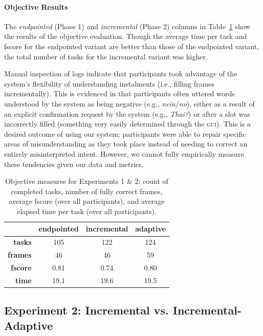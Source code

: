 \documentclass[11pt]{article}
\newcommand{\ui}[0]{\textsc{gui}}
\begin{document}
\paragraph{Objective Results}  The \emph{endpointed} (Phase 1) and \emph{incremental} (Phase 2) columns in Table~\ref{tab:objscores} show the results of the objective evaluation. Though the average time per task and fscore for the endpointed variant are better than those of the endpointed variant, the total number of tasks for the incremental variant was higher. 

Manual inspection of logs indicate that participants took advantage of the system's flexibility of understanding instalments (i.e., filling frames incrementally). This is evidenced in that participants often uttered words understood by the system as being negative (e.g., \emph{nein}/\emph{no}), either as a result of an explicit confirmation request by the system (e.g., \emph{Thai?}) or after a slot was incorrectly filled (something very easily determined through the \ui). This is a desired outcome of using our system; participants were able to repair specific areas of misunderstanding as they took place instead of needing to correct an entirely misinterpreted intent. However, we cannot fully empirically measure these tendencies given our data and metrics. 

\begin{table}
 \begin{tabular}{|r|c|c|c|}
\hline
                     & \textbf{endpointed} & \textbf{incremental} & \textbf{adaptive} \\
\hline
\textbf{tasks} & 105 & 122 & 124  \\
\textbf{frames} & 46 & 46 & 59 \\
\textbf{fscore} & 0.81 & 0.74 & 0.80 \\
\textbf{time} & 19.1 & 19.6 & 19.5 \\
 \hline
\end{tabular}
\caption{Objective measures for Experiments 1 \& 2: count of completed tasks, number of fully correct frames, average fscore (over all participants), and average elapsed time per task (over all participants).}
\label{tab:objscores}
\end{table}

\subsection{Experiment 2: Incremental vs. Incremental-Adaptive}
\label{section:exp2}
\end{document}
